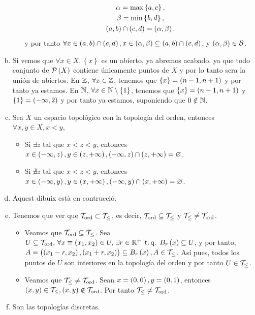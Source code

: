 \begin{eje}
\begin{enumerate}[(a)]
\begin{enumerate}[i)]
                    \begin{gather*}
                        \alpha = \max \left\{ a, c \right\}, \\
                        \beta = \min \left\{ b, d \right\}, \\
                        \left( a, b \right) \cap \left( c, d \right) = \left( \alpha, \beta \right).
                    \end{gather*}
                    y por tanto $\forall x \in \left( a, b \right) \cap \left( c, d \right), x \in \left( \alpha, \beta \right) \subseteq \left( a, b \right) \cap \left( c, d \right)$, y $\left( \alpha, \beta \right) \in \mathcal{B}$.
            \end{enumerate}
        \item Si vemos que $\forall x \in X, \left\{ x \right\}$ es un abierto, ya abremos acabado, ya que todo conjunto de $\mathcal{P} \left( X \right)$ contiene únicamente puntos de $X$ y por lo tanto sera la unión de abiertos. En $\mathbb{Z}$, $\forall x \in \mathbb{Z}$, tenemos que $\left\{ x \right\} = \left( n-1, n+1 \right)$ y por tanto ya estamos. En $\mathbb{N}$, $\forall x \in \mathbb{N} \setminus \left\{ 1 \right\}$, tenemos que $\left\{ x \right\} = \left( n-1, n+1 \right)$ y $\left\{ 1 \right\} = \left( -\infty, 2 \right)$ y por tanto ya estamos, suponiendo que $0 \notin \mathbb{N}$.
        \item Sea $X$ un espacio topológico con la topología del orden, entonces $\forall x, y \in X, x < y$,
            \begin{itemize}
                \item Si $\exists z$ tal que $x < z < y$, entonces $x \in \left( -\infty, z \right), y \in \left( z, +\infty \right), \left( -\infty, z \right) \cap \left( z, +\infty \right) = \varnothing$.
                \item Si $\nexists z$ tal que $x < z < y$, entonces $x \in \left( -\infty, y \right), y \in \left( x, +\infty \right), \left( -\infty, y \right) \cap \left( x, +\infty \right) = \varnothing$.
            \end{itemize}
        \item Aquest dibuix està en contrucció. %
        \item Tenemos que ver que $\mathcal{T}_{\text{ord}} \subset \mathcal{T}_\leq$, es decir, $\mathcal{T}_{\text{ord}} \subseteq \mathcal{T}_\leq$ y $\mathcal{T}_\leq \neq \mathcal{T}_{\text{ord}}$.
            \begin{itemize}
                \item Veamos que $\mathcal{T}_{\text{ord}} \subseteq \mathcal{T}_\leq$. Sea $U \subseteq \mathcal{T}_{\text{ord}},\, \forall x \equiv \left( x_1, x_2 \right) \in U, \, \exists r \in \mathbb{R}^+ \operatorname{\;t.q.\;} B_r \left( x \right) \subseteq U$, y por tanto, $A = \left( \left( x_1 - r, x_2 \right), \left( x_1 + r, x_2 \right) \right) \subseteq B_r \left( x \right), A \in \mathcal{T}_\leq$. Así pues, todos los puntos de $U$ son interiores en la topología del orden y por tanto $U \in \mathcal{T}_\leq$.
                \item Veamos que $\mathcal{T}_\leq \neq \mathcal{T}_{\text{ord}}$. Sean $x = \left( 0,0 \right), y = \left( 0, 1 \right)$, entonces $\left( x, y \right) \in \mathcal{T}_\leq, \left( x, y \right) \notin \mathcal{T}_{\text{ord}}$. Por tanto $\mathcal{T}_\leq \neq \mathcal{T}_{\text{ord}}$.
            \end{itemize}
        \item Son las topologías discretas.
    \end{enumerate}
\end{eje}
